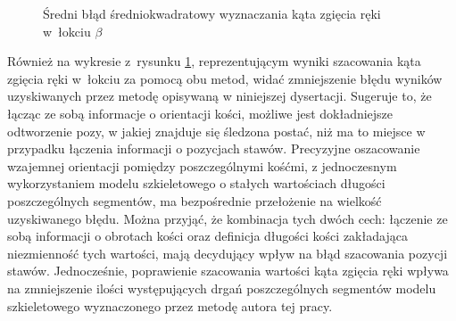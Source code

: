 																															
\begin{savenotes}
	\begin{figure}[!htb]
		\centering
		\caption{Średni błąd średniokwadratowy wyznaczania kąta zgięcia ręki w~łokciu $\beta$}
		\label{fig:experiments:angle:summary}
	\end{figure}
\end{savenotes}


Również na wykresie z~rysunku \ref{fig:experiments:angle:summary}, reprezentującym wyniki szacowania kąta zgięcia ręki w~łokciu za pomocą obu metod, widać zmniejszenie błędu wyników uzyskiwanych przez metodę opisywaną w niniejszej dysertacji. Sugeruje to, że łącząc ze sobą informacje o orientacji kości, możliwe jest dokładniejsze odtworzenie pozy, w jakiej znajduje się śledzona postać, niż ma to miejsce w przypadku łączenia informacji o pozycjach stawów. Precyzyjne oszacowanie wzajemnej orientacji pomiędzy poszczególnymi kośćmi, z jednoczesnym wykorzystaniem modelu szkieletowego o stałych wartościach długości poszczególnych segmentów, ma bezpośrednie przełożenie na wielkość uzyskiwanego błędu. Można przyjąć, że kombinacja tych dwóch cech: łączenie ze sobą informacji o obrotach kości oraz definicja długości kości zakładająca niezmienność tych wartości, mają decydujący wpływ na błąd szacowania pozycji stawów. Jednocześnie, poprawienie szacowania wartości kąta zgięcia ręki wpływa na zmniejszenie ilości występujących drgań poszczególnych segmentów modelu szkieletowego wyznaczonego przez metodę autora tej pracy.